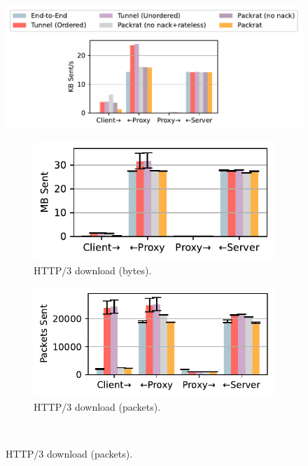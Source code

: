 \begin{figure}[ht]
\begin{minipage}[t]{0.3\textwidth}
    \label{fig:spurious}
\end{minipage}%
\hfill
\begin{minipage}[t]{0.68\textwidth}
    \centering
    \includegraphics[width=0.9\linewidth, trim=5 140 5 5, clip]{figures/network_stats_media_legend.pdf}
    
    \begin{subfigure}[b]{0.48\linewidth}
        \centering
        \includegraphics[width=\linewidth]{figures/network_stats_http_tx_bytes.pdf}
        \caption{HTTP/3 download (bytes).}
        \label{fig:link-overheads:http-bytes}
    \end{subfigure}
    \begin{subfigure}[b]{0.51\linewidth}
        \centering
        \includegraphics[width=\linewidth]{figures/network_stats_http_tx_packets.pdf}
        \caption{HTTP/3 download (packets).}
        \label{fig:link-overheads:http-packets}
    \end{subfigure}\\


\end{minipage}
\end{figure}

